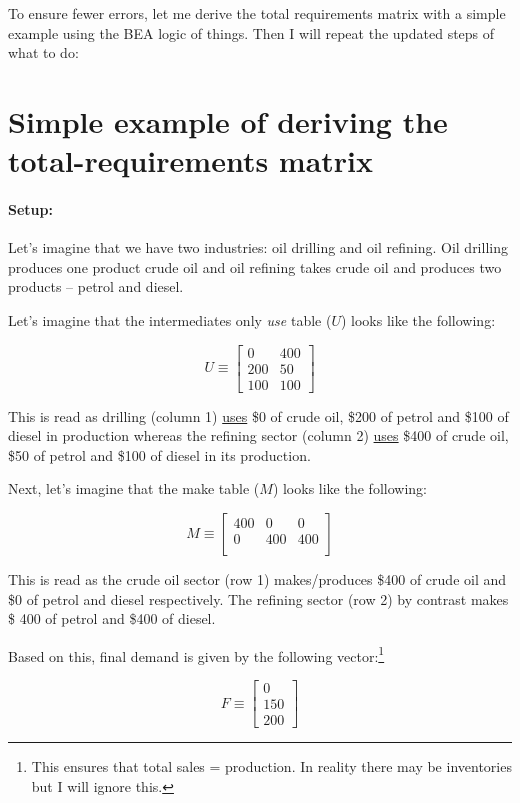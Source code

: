 \documentclass[12pt,english]{article}
\newcommand{\hlight}[1]{\textcolor{org}{#1}}
\begin{document}
\hlight{To ensure fewer errors, let me derive the total requirements matrix with a simple example using the BEA logic of things. Then I will repeat the updated steps of what to do:}


\section*{\hlight{Simple example of deriving the total-requirements matrix}}

\paragraph{\hlight{Setup:}}
\hlight{Let's imagine that we have two industries: oil drilling and oil refining. Oil drilling produces one product crude oil and oil refining takes crude oil and produces two products -- petrol and diesel. }

\hlight{Let's imagine that the intermediates only \emph{use} table ($U$) looks like the following:}

\hlight{$$
	U\equiv \begin{bmatrix}
	 	0 & 400\\
	 	200 & 50 \\
	 	100 & 100
	\end{bmatrix}
$$}

\hlight{This is read as drilling (column 1) \underline{uses} \$0 of crude oil, \$200 of  petrol and \$100 of diesel in production whereas the refining sector (column 2)  \underline{uses} \$400 of crude oil, \$50 of petrol and \$100 of diesel in its production.}

\hlight{Next, let's imagine that the make table ($M$) looks like the following:}

\hlight{$$
	M\equiv \begin{bmatrix}
		400 & 0& 0\\
		0 & 400 & 400\\
	\end{bmatrix}
$$}

\hlight{This is read as the crude oil sector (row 1) makes/produces \$400 of crude oil and \$0 of petrol and diesel respectively. The refining sector (row 2) by contrast makes \$ 400 of petrol and \$400 of diesel.}

\hlight{Based on this, final demand is given by the following vector:\footnote{\hlight{This ensures that total sales = production. In reality there may be inventories but I will ignore this.}}}

\hlight{$$
	F \equiv \begin{bmatrix}
		0\\150\\200
	\end{bmatrix}
$$}
\end{document}

